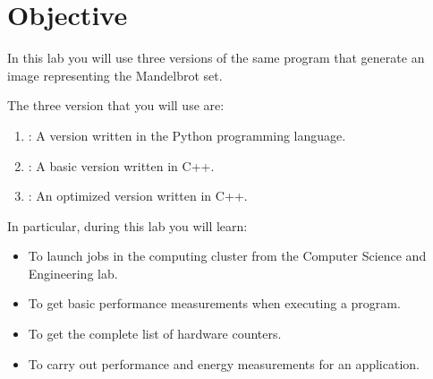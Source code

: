 \section{Objective}

In this lab you will use three versions of the same program
that generate an image representing the Mandelbrot set.

The three version that you will use are:

\begin{enumerate}
  \item {}: 
        A version written in the Python programming language.
  \item {}: 
        A basic version written in C++.
  \item {}: 
        An optimized version written in C++.
\end{enumerate}

In particular, during this lab you will learn:


\begin{itemize}
  \item To launch jobs in the computing cluster from the Computer Science and Engineering lab.
  \item To get basic performance measurements when executing a program.
  \item To get the complete list of hardware counters.
  \item To carry out performance and energy measurements for an application.
\end{itemize}
